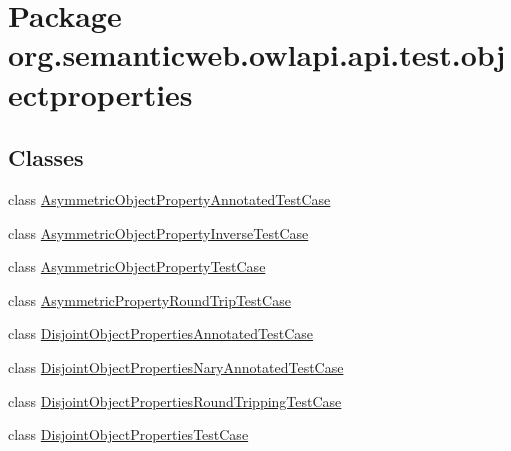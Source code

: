 \hypertarget{namespaceorg_1_1semanticweb_1_1owlapi_1_1api_1_1test_1_1objectproperties}{\section{Package org.\-semanticweb.\-owlapi.\-api.\-test.\-objectproperties}
\label{namespaceorg_1_1semanticweb_1_1owlapi_1_1api_1_1test_1_1objectproperties}
}
\subsection*{Classes}
\begin{DoxyCompactItemize}
\item 
class \hyperlink{classorg_1_1semanticweb_1_1owlapi_1_1api_1_1test_1_1objectproperties_1_1_asymmetric_object_property_annotated_test_case}{Asymmetric\-Object\-Property\-Annotated\-Test\-Case}
\item 
class \hyperlink{classorg_1_1semanticweb_1_1owlapi_1_1api_1_1test_1_1objectproperties_1_1_asymmetric_object_property_inverse_test_case}{Asymmetric\-Object\-Property\-Inverse\-Test\-Case}
\item 
class \hyperlink{classorg_1_1semanticweb_1_1owlapi_1_1api_1_1test_1_1objectproperties_1_1_asymmetric_object_property_test_case}{Asymmetric\-Object\-Property\-Test\-Case}
\item 
class \hyperlink{classorg_1_1semanticweb_1_1owlapi_1_1api_1_1test_1_1objectproperties_1_1_asymmetric_property_round_trip_test_case}{Asymmetric\-Property\-Round\-Trip\-Test\-Case}
\item 
class \hyperlink{classorg_1_1semanticweb_1_1owlapi_1_1api_1_1test_1_1objectproperties_1_1_disjoint_object_properties_annotated_test_case}{Disjoint\-Object\-Properties\-Annotated\-Test\-Case}
\item 
class \hyperlink{classorg_1_1semanticweb_1_1owlapi_1_1api_1_1test_1_1objectproperties_1_1_disjoint_object_properties_nary_annotated_test_case}{Disjoint\-Object\-Properties\-Nary\-Annotated\-Test\-Case}
\item 
class \hyperlink{classorg_1_1semanticweb_1_1owlapi_1_1api_1_1test_1_1objectproperties_1_1_disjoint_object_properties_round_tripping_test_case}{Disjoint\-Object\-Properties\-Round\-Tripping\-Test\-Case}
\item 
class \hyperlink{classorg_1_1semanticweb_1_1owlapi_1_1api_1_1test_1_1objectproperties_1_1_disjoint_object_properties_test_case}{Disjoint\-Object\-Properties\-Test\-Case}

\end{DoxyCompactItemize}
